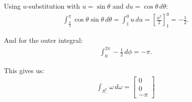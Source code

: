Using $u$-substitution with $u=\sin\theta$ and
$du=\cos\theta\,d\theta$:
\begin{gather*}
\int_{\frac{\pi}{2}}^{\pi}
\cos\theta\sin\theta \, d\theta
= \int_{1}^{0} u \, du
= \left[\frac{u^2}{2}\right]_{1}^{0}
= -\frac{1}{2}.
\end{gather*}

And for the outer integral:
\begin{gather*}
\int_{0}^{2\pi} -\frac{1}{2} \, d\phi = -\pi.
\end{gather*}

This gives us:
\begin{gather*}
\boxed{
\int_{S^2_-} \omega \, d\omega =
\begin{bmatrix}
0 \\ 0 \\ -\pi
\end{bmatrix}
}
\end{gather*}
